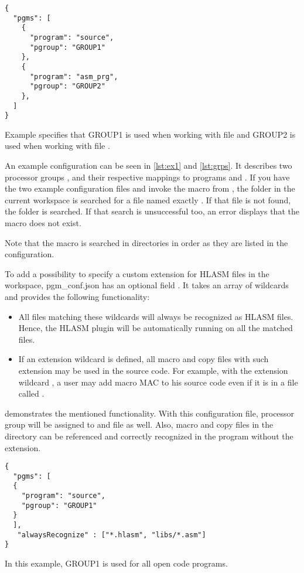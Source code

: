\begin{listing}
	\begin{verbatim}
{
  "pgms": [
    {
      "program": "source",
      "pgroup": "GROUP1"
    },
    {
      "program": "asm_prg",
      "pgroup": "GROUP2"
    },
  ]
}
	\end{verbatim}
	\caption{Example  specifies that GROUP1 is used when working with file  and GROUP2 is used when working with file .}
	\label{lst:grps}
\end{listing}

An example configuration can be seen in \cref{lst:ex1} and \cref{lst:grps}. It describes two processor groups ,  and their respective mappings to programs  and . If you have the two example configuration files and invoke the  macro from , the folder  in the current workspace is searched for a file named exactly . If that file is not found, the folder  is searched. If that search is unsuccessful too, an error displays that the macro does not exist.

Note that the macro  is searched in directories in order as they are listed in the configuration. 

To add a possibility to specify a custom extension for HLASM files in the workspace, {pgm\_conf.json} has an optional field . It takes an array of wildcards and provides the following functionality:
\begin{itemize}
	\item All files matching these wildcards will always be recognized as HLASM files. Hence, the HLASM plugin will be automatically running on all the matched files.
	\item If an extension wildcard is defined, all macro and copy files with such extension may be used in the source code. For example, with the extension wildcard , a user may add macro MAC to his source code even if it is in a file called .
\end{itemize}

 demonstrates the mentioned functionality. With this configuration file, processor group  will be assigned to  and  file as well. Also, macro and copy files in the  directory can be referenced and correctly recognized in the program without the  extension.


\begin{listing}
	\begin{verbatim}
{
  "pgms": [
  {
    "program": "source",
    "pgroup": "GROUP1"
  }
  ],
   "alwaysRecognize" : ["*.hlasm", "libs/*.asm"]
}
	\end{verbatim}
	\caption{In this example, GROUP1 is used for all open code programs.}
	\label{lst:alw}
\end{listing}

